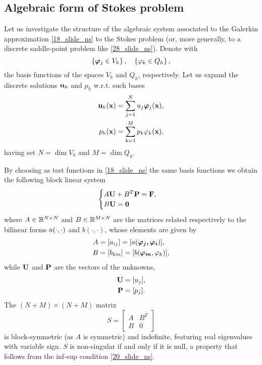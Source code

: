 \subsection*{Algebraic form of Stokes problem}
Let us investigate the structure of the algebraic system associated to the Galerkin approximation \eqref{18_slide_ns} to the Stokes problem (or, more generally, to a discrete saddle-point problem like \eqref{28_slide_ns}). Denote with 
\[
    \left\{ \bm{\phi}_j \in V_h \right\}, \quad \left\{ \oldphi_k \in Q_h \right\},
\]
the basis functions of the spaces \(V_h\) and \(Q_h\), respectively. Let us expand the discrete solutions \(\textbf{u}_h\) and \(p_h\) w.r.t. such bases 
\begin{equation}
    \begin{aligned}
        \uvec_h(\xvec) &= \sum_{j=1}^{N} u_j\bm{\phi}_j(\xvec), \\
        p_h(\xvec) &= \sum_{k=1}^{M} p_k\oldphi_k(\xvec),
        \label{46_slide_ns}
    \end{aligned}
\end{equation}
having set \(N = \dim V_h\) and \(M = \dim Q_h\).

By choosing as test functions in \eqref{18_slide_ns} the same basis functions we obtain the following block linear system 
\begin{equation}
    \begin{cases}
        A\textbf{U} + B^T \textbf{P} = \textbf{F}, \\
        B\textbf{U} = \textbf{0}
    \end{cases}
    \label{47_slide_ns}
\end{equation}
where \(A \in \mathbb{R}^{N\times N}\) and \(B \in \mathbb{R}^{M \times N}\) are the matrices related respectively to the bilinear forms \(a(\cdot, \cdot)\) and \(b(\cdot, \cdot)\), whose elements are given by 
\begin{align*}
    A &= [a_{ij}] = [a(\bm{\phi_j, \phi_i})], \\
    B &= [b_{km}] = [b(\bm{\phi_m}, \oldphi_k)],
\end{align*}
while \(\textbf{U}\) and \(\textbf{P}\) are the vectors of the unknowns, 
\begin{align*}
    \textbf{U} &= [u_j], \\
    \textbf{P} &= [p_j].
\end{align*}
The \((N+M) \times (N+M)\) matrix 
\begin{equation}
    S = \left[ \begin{matrix}
        A & B^T \\ B & 0
    \end{matrix} \right]
    \label{48_slide_ns}
\end{equation}
is block-symmetric (as \(A\) is symmetric) and indefinite, featuring real eigenvalues with variable sign. \(S\) is non-singular if and only if it is null, a property that follows from the inf-sup condition \eqref{20_slide_ns}.

